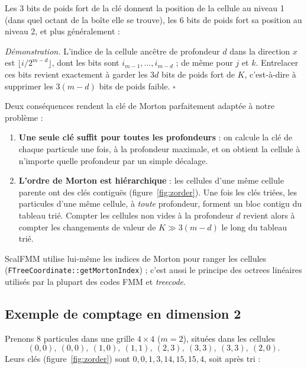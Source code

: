 \documentclass[11pt,a4paper]{article}
\newcommand{\code}[1]{\texttt{#1}}
\begin{document}
Les $3$ bits de poids fort de la clé donnent la position de la cellule au niveau 1 (dans quel
octant de la boîte elle se trouve), les 6 bits de poids fort sa position au niveau 2, et plus
généralement :

\medskip
\noindent{}
\medskip

\noindent\emph{Démonstration.} L'indice de la cellule ancêtre de profondeur $d$ dans la direction
$x$ est $\lfloor i / 2^{m-d} \rfloor$, dont les bits sont $i_{m-1}, \dots, i_{m-d}$ ; de même pour
$j$ et $k$. Entrelacer ces bits revient exactement à garder les $3d$ bits de poids fort de $K$,
c'est-à-dire à supprimer les $3(m-d)$ bits de poids faible. $\square$

\medskip
Deux conséquences rendent la clé de Morton parfaitement adaptée à notre problème :
\begin{enumerate}
  \item \textbf{Une seule clé suffit pour toutes les profondeurs} : on calcule la clé de chaque
        particule une fois, à la profondeur maximale, et on obtient la cellule à n'importe quelle
        profondeur par un simple décalage.
  \item \textbf{L'ordre de Morton est hiérarchique} : les cellules d'une même cellule parente
        ont des clés contiguës (figure~\ref{fig:zorder}). Une fois les clés triées, les
        particules d'une même cellule, à \emph{toute} profondeur, forment un bloc contigu du
        tableau trié. Compter les cellules non vides à la profondeur $d$ revient alors à compter
        les changements de valeur de $K \gg 3(m-d)$ le long du tableau trié.
\end{enumerate}

ScalFMM utilise lui-même les indices de Morton pour ranger les cellules
(\code{FTreeCoordinate::getMortonIndex}) ; c'est aussi le principe des octrees linéaires utilisés
par la plupart des codes FMM et \emph{treecode}.

\subsection{Exemple de comptage en dimension 2}

Prenons 8 particules dans une grille $4 \times 4$ ($m = 2$), situées dans les cellules
\[
(0,0),\ (0,0),\ (1,0),\ (1,1),\ (2,3),\ (3,3),\ (3,3),\ (2,0).
\]
Leurs clés (figure~\ref{fig:zorder}) sont $0, 0, 1, 3, 14, 15, 15, 4$, soit après tri :
\end{document}

